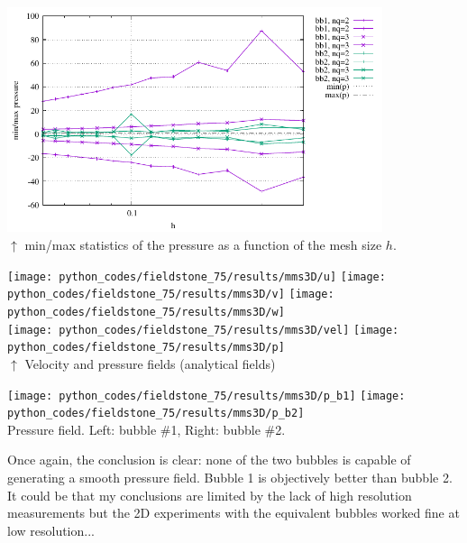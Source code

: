 \begin{center}
\includegraphics[width=11cm]{python_codes/fieldstone_75/results/mms3D/p_stats.pdf}\\
{\captionfont $\uparrow$ min/max statistics of the pressure as a function of the mesh size $h$.}
\end{center}


\begin{center}
\texttt{[image: python\_codes/fieldstone\_75/results/mms3D/u]}
\texttt{[image: python\_codes/fieldstone\_75/results/mms3D/v]}
\texttt{[image: python\_codes/fieldstone\_75/results/mms3D/w]}\\
\texttt{[image: python\_codes/fieldstone\_75/results/mms3D/vel]}
\texttt{[image: python\_codes/fieldstone\_75/results/mms3D/p]}\\
{\captionfont $\uparrow$ Velocity and pressure fields (analytical fields)}
\end{center}

\begin{center}
\texttt{[image: python\_codes/fieldstone\_75/results/mms3D/p\_b1]}
\texttt{[image: python\_codes/fieldstone\_75/results/mms3D/p\_b2]}\\
{\captionfont Pressure field. Left: bubble \#1, Right: bubble \#2.}
\end{center}

Once again, the conclusion is clear: none of the two bubbles is capable of generating a 
smooth pressure field. Bubble 1 is objectively better than bubble 2.
It could be that my conclusions are limited by the lack of high resolution measurements
but the 2D experiments with the equivalent bubbles worked fine at low resolution...
